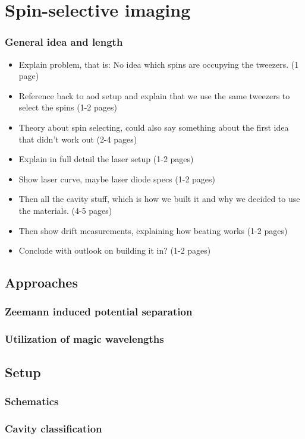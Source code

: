 \chapter{Spin-selective imaging}
\label{ch:spin_resolved}
\subsection*{General idea and length}

\begin{itemize}
	\item Explain problem, that is: No idea which spins are occupying the tweezers. (1 page)
	\item Reference back to aod setup and explain that we use the same tweezers to select the spins (1-2 pages)
	\item Theory about spin selecting, could also say something about the first idea that didn't work out (2-4 pages)
	\item Explain in full detail the laser setup (1-2 pages)
	\item Show laser curve, maybe laser diode specs (1-2 pages)
	\item Then all the cavity stuff, which is how we built it and why we decided to use the materials. (4-5 pages)
	\item Then show drift measurements, explaining how beating works (1-2 pages)
	\item Conclude with outlook on building it in? (1-2 pages)
\end{itemize}

	\section{Approaches}
		\subsection{Zeemann induced potential separation}
		\subsection{Utilization of magic wavelengths}
	\section{Setup}
		\subsection{Schematics}
		\subsection{Cavity classification}

